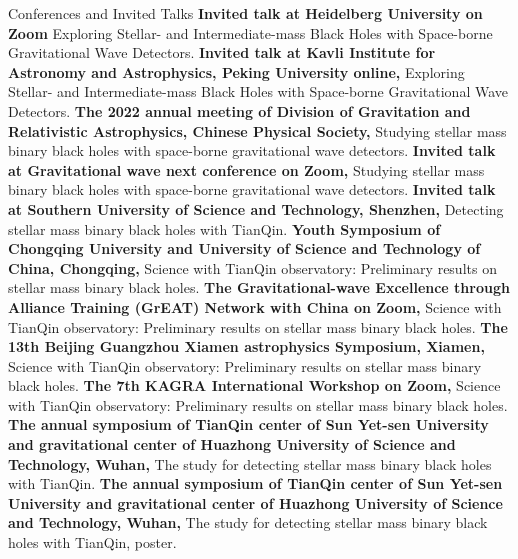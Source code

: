 
\begin{rubric}{Conferences and Invited Talks}
    \entry*[2023] \textbf{Invited talk at Heidelberg University on Zoom} Exploring Stellar- and Intermediate-mass Black Holes with Space-borne Gravitational Wave Detectors.
    \entry*[2023] \textbf{Invited talk at Kavli Institute for Astronomy and Astrophysics, Peking University online,} Exploring Stellar- and Intermediate-mass Black Holes with Space-borne Gravitational Wave Detectors.
    \entry*[2022] \textbf{The 2022 annual meeting of Division of Gravitation and Relativistic Astrophysics, Chinese Physical Society,} Studying stellar mass binary black holes with space-borne gravitational wave detectors.
    \entry*[2022] \textbf{Invited talk at Gravitational wave next conference on Zoom,} Studying stellar mass
    binary black holes with space-borne gravitational wave detectors.
    \entry*[2022] \textbf{Invited talk at Southern University of Science and Technology, Shenzhen,} Detecting stellar mass
    binary black holes with TianQin. 
    \entry*[2021] \textbf{Youth Symposium of Chongqing University and University of Science and Technology of China,
    Chongqing,} Science with TianQin observatory: Preliminary results on stellar mass binary black holes.
    \entry*[2021] \textbf{The Gravitational-wave Excellence through Alliance Training (GrEAT) Network with China on
    Zoom,} Science with TianQin observatory: Preliminary results on stellar mass binary black holes.
    \entry*[2020] \textbf{The 13th Beijing Guangzhou Xiamen astrophysics Symposium, Xiamen,} Science with
    TianQin observatory: Preliminary results on stellar mass binary black holes.
    \entry*[2020] \textbf{The 7th KAGRA International Workshop on Zoom,} Science with
    TianQin observatory: Preliminary results on stellar mass binary black holes.
    \entry*[2019] \textbf{The annual symposium of TianQin center of Sun Yet-sen University and gravitational center of
    Huazhong University of Science and Technology,
    Wuhan,} The study for detecting stellar mass binary black holes with TianQin. 
    \entry*[2018] \textbf{The annual symposium of TianQin center of Sun Yet-sen University and gravitational center of
    Huazhong University of Science and Technology,
    Wuhan,} The study for detecting stellar mass binary black holes with TianQin, poster.
\end{rubric}
